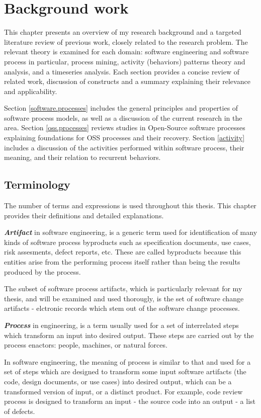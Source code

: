 \chapter{Background work}
This chapter presents an overview of my research background and a targeted literature 
review of previous work, closely related to the research problem.
The relevant theory is examined for each domain: software engineering and software process
in particular, process mining, activity (behaviors) patterns theory and analysis, and 
a timeseries analysis. Each section provides a concise review of related work, discussion 
of constructs and a summary explaining their relevance and applicability. 

Section \ref{software.processes} includes the general principles and properties of 
software process models, as well as a discussion of the current research in the area.
Section \ref{oss.processes} reviews studies in Open-Source software processes
explaining foundations for OSS processes and their recovery.
Section \ref{activity} includes a discussion of the activities performed within software
process, their meaning, and their relation to recurrent behaviors.

\section{Terminology}\label{definitions}
The number of terms and expressions is used throughout this thesis. This chapter provides
their definitions and detailed explanations.

\textit{\textbf{Artifact}} in software engineering, is a generic term used for identification
of many kinds of software process byproducts such as specification documents, use cases, 
risk assesments, defect reports, etc. These are called byproducts because this entities
arise from the performing process itself rather than being the results produced by the process.

The subset of software process artifacts, which is particularly relevant for my thesis, 
and will be examined and used thorougly, is the set of software change artifacts - 
elctronic records which stem out of the software change processes.

\textit{\textbf{Process}} in engineering, is a term usually used for a set of interrelated 
steps which transform an input into desired output. These steps are carried out by the process
enactors: people, machines, or natural forces. 

In software engineering, the meaning of process is similar to that and used for a set of steps 
which are designed to transform some input software artifacts (the code, design documents, 
or use cases) into desired output, which can be a transformed version of input, or a
distinct product. For example, code review process is designed to transform an input - the 
source code into an output - a list of defects.

